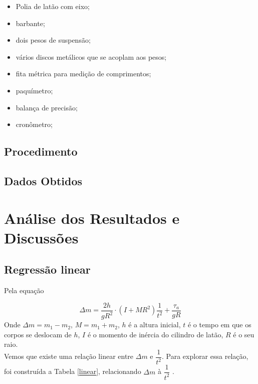 \documentclass[12pt,a4paper]{article}
\begin{document}
\begin{itemize}
	\item Polia de latão com eixo;
	\item barbante;
	\item dois pesos de suspensão;
	\item vários discos metálicos que se acoplam aos pesos;
	\item fita métrica para medição de comprimentos;
	\item paquímetro;
	\item balança de precisão;
	\item cronômetro;
\end{itemize}

\subsection{Procedimento}





\subsection{Dados Obtidos}


\section{Análise dos Resultados e Discussões}
\subsection{Regressão linear}
Pela equação 

$$\Delta m = \frac{2h}{gR^2} \cdot (I + MR^2)\dfrac{1}{t^2}  + \frac{\tau _a} {gR}$$
Onde $\Delta m = m_1 - m_2$, $ M = m_1 + m_2 $, $h$ é a altura inicial, $t$ é o tempo em que os corpos se deslocam de $h$, $I$ é o momento de inércia do cilindro de latão, $R$ é o seu raio.\\
Vemos que existe uma relação linear entre $\Delta m$ e $ \dfrac{1}{t^2}$. Para explorar essa relação, foi construída a Tabela \ref{linear}, relacionando $\Delta m$ à $ \dfrac{1}{t^2} $ .
\end{document}
